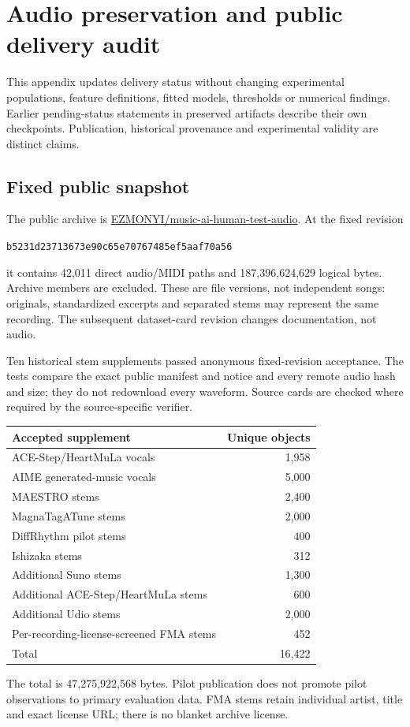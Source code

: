 \clearpage
\section{Audio preservation and public delivery audit}
\label{sec:delivery-audit}
This appendix updates delivery status without changing experimental populations,
feature definitions, fitted models, thresholds or numerical findings. Earlier
pending-status statements in preserved artifacts describe their own checkpoints.
Publication, historical provenance and experimental validity are distinct claims.

\subsection{Fixed public snapshot}
The public archive is
\href{https://huggingface.co/datasets/EZMONYI/music-ai-human-test-audio}{EZMONYI/music-ai-human-test-audio}.
At the fixed revision
\begin{center}\small\texttt{b5231d23713673e90c65e70767485ef5aaf70a56}\end{center}
it contains
42,011 direct audio/MIDI paths and 187,396,624,629 logical bytes. Archive members
are excluded. These are file versions, not independent songs: originals,
standardized excerpts and separated stems may represent the same recording.
The subsequent dataset-card revision changes documentation, not audio.

Ten historical stem supplements passed anonymous fixed-revision acceptance.
The tests compare the exact public manifest and notice and every remote audio
hash and size; they do not redownload every waveform. Source cards are checked
where required by the source-specific verifier.

\begin{center}
\begin{tabular}{lr}
\toprule
Accepted supplement & Unique objects \\
\midrule
ACE-Step/HeartMuLa vocals & 1,958 \\
AIME generated-music vocals & 5,000 \\
MAESTRO stems & 2,400 \\
MagnaTagATune stems & 2,000 \\
DiffRhythm pilot stems & 400 \\
Ishizaka stems & 312 \\
Additional Suno stems & 1,300 \\
Additional ACE-Step/HeartMuLa stems & 600 \\
Additional Udio stems & 2,000 \\
Per-recording-license-screened FMA stems & 452 \\
\midrule
Total & 16,422 \\
\bottomrule
\end{tabular}
\end{center}
The total is 47,275,922,568 bytes. Pilot publication does not promote pilot
observations to primary evaluation data. FMA stems retain individual artist,
title and exact license URL; there is no blanket archive license.

